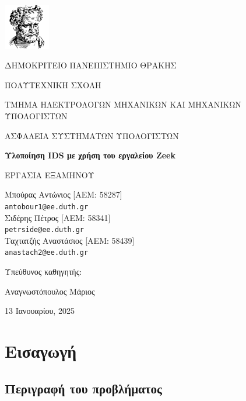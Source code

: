 \documentclass{article}
\begin{document}
\begin{titlepage}
	\centering
	\greekduth
	\includegraphics[width=0.15\textwidth]{images/duth}\par\vspace{0.5cm}
	{\large\textsc{ΔΗΜΟΚΡΙΤΕΙΟ ΠΑΝΕΠΙΣΤΗΜΙΟ ΘΡΑΚΗΣ}\par}
	\vspace{0.1cm}
	{\large\textsc{ΠΟΛΥΤΕΧΝΙΚΗ ΣΧΟΛΗ}\par}
	\vspace{0.1cm}
	{\large\textsc{ΤΜΗΜΑ ΗΛΕΚΤΡΟΛΟΓΩΝ ΜΗΧΑΝΙΚΩΝ ΚΑΙ ΜΗΧΑΝΙΚΩΝ ΥΠΟΛΟΓΙΣΤΩΝ}\par}
	\vspace{4cm}
	{\lsstyle\greektitle\large\textsc{ΑΣΦΑΛΕΙΑ ΣΥΣΤΗΜΑΤΩΝ ΥΠΟΛΟΓΙΣΤΩΝ}\par}
	\vspace{0.25cm}
	{\huge\bfseries Υλοποίηση IDS με χρήση του εργαλείου Zeek\par}
	\vspace{0.25cm}
	{\greektitle\large\textsc{ΕΡΓΑΣΙΑ ΕΞΑΜΗΝΟΥ}\par}
	\vspace{2cm}
	{Μπούρας Αντώνιος [ΑΕΜ: 58287]\\
	\texttt{antobour1@ee.duth.gr}\\
	Σιδέρης Πέτρος [ΑΕΜ: 58341]\\
	\texttt{petrside@ee.duth.gr}\\
	Ταχτατζής Αναστάσιος [ΑΕΜ: 58439]\\
	\texttt{anastach2@ee.duth.gr}
	\par}
	\vfill
	Υπεύθυνος καθηγητής:\par
	Αναγνωστόπουλος Μάριος

	\vfill

	{\large 13 Ιανουαρίου, 2025\par}
\end{titlepage}
{
  \hypersetup{linkcolor=black}
  \tableofcontents
}
\newpage

\section{Εισαγωγή}

\nocite{*}

\subsection{Περιγραφή του προβλήματος}

\end{document}
